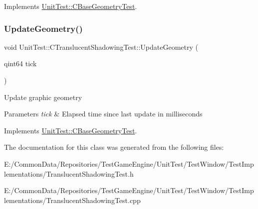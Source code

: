 Implements \mbox{\hyperlink{class_unit_test_1_1_c_base_geometry_test_a16e5804e7f134ae519722c47e756e3b0}{Unit\+Test\+::\+C\+Base\+Geometry\+Test}}.

\mbox{\label{class_unit_test_1_1_c_translucent_shadowing_test_a6d0809018d48d6f3f9e80147b894da5d}} 
\subsubsection{\texorpdfstring{UpdateGeometry()}{UpdateGeometry()}}
{\footnotesize\ttfamily void Unit\+Test\+::\+C\+Translucent\+Shadowing\+Test\+::\+Update\+Geometry (\begin{DoxyParamCaption}\item[{qint64}]{tick }\end{DoxyParamCaption})\hspace{0.3cm}{\ttfamily [virtual]}}

Update graphic geometry 
\begin{DoxyParams}{Parameters}
{\em tick} & Elapsed time since last update in milliseconds \\
\hline
\end{DoxyParams}


Implements \mbox{\hyperlink{class_unit_test_1_1_c_base_geometry_test_afe9560d667ef457f7a203453c10593fd}{Unit\+Test\+::\+C\+Base\+Geometry\+Test}}.



The documentation for this class was generated from the following files\+:\begin{DoxyCompactItemize}
\item 
E\+:/\+Common\+Data/\+Repositories/\+Test\+Game\+Engine/\+Unit\+Test/\+Test\+Window/\+Test\+Implementations/Translucent\+Shadowing\+Test.\+h\item 
E\+:/\+Common\+Data/\+Repositories/\+Test\+Game\+Engine/\+Unit\+Test/\+Test\+Window/\+Test\+Implementations/Translucent\+Shadowing\+Test.\+cpp\end{DoxyCompactItemize}
